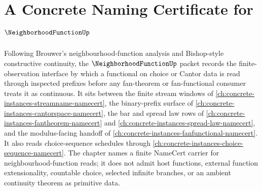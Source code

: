 \chapter{A Concrete Naming Certificate for $\NeighborhoodFunctionUp$}
\label{ch:concrete-instances-neighborhood-function-namecert}

Following Brouwer's neighbourhood-function analysis and Bishop-style constructive continuity, the $\NeighborhoodFunctionUp$ packet records the finite-observation interface by which a functional on choice or Cantor data is read through inspected prefixes before any fan-theorem or fan-functional consumer treats it as continuous. It sits between the finite stream windows of \autoref{ch:concrete-instances-streamname-namecert}, the binary-prefix surface of \autoref{ch:concrete-instances-cantorspace-namecert}, the bar and spread law rows of \autoref{ch:concrete-instances-fantheorem-namecert} and \autoref{ch:concrete-instances-spread-law-namecert}, and the modulus-facing handoff of \autoref{ch:concrete-instances-fanfunctional-namecert}. It also reads choice-sequence schedules through \autoref{ch:concrete-instances-choice-sequence-namecert}. The chapter names a finite NameCert carrier for neighbourhood-function reads; it does not admit host functions, external function extensionality, countable choice, selected infinite branches, or an ambient continuity theorem as primitive data.

